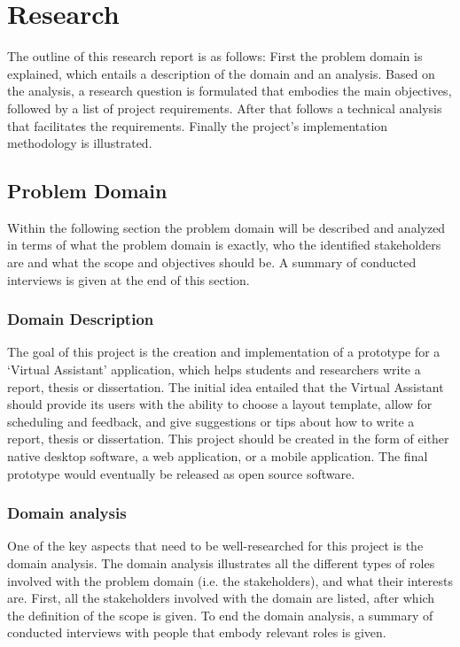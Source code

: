 \chapter{Research}

The outline of this research report is as follows: First the problem domain is explained, which entails a description of the domain and an analysis. Based on the analysis, a research question is formulated that embodies the main objectives, followed by a list of project requirements. After that follows a technical analysis that facilitates the requirements. Finally the project's implementation methodology is illustrated.

\section{Problem Domain} %
\label{sec:problem_domain}


Within the following section the problem domain will be described and analyzed in terms of what the problem domain is exactly, who the identified stakeholders are and what the scope and objectives should be. A summary of conducted interviews is given at the end of this section.

\subsection{Domain Description} %
\label{sub:problem_description}

The goal of this project is the creation and implementation of a prototype for a `Virtual Assistant' application, which helps students and researchers write a report, thesis or dissertation. The initial idea entailed that the Virtual Assistant should provide its users with the ability to choose a layout template, allow for scheduling and feedback, and give suggestions or tips about how to write a report, thesis or dissertation. This project should be created in the form of either native desktop software, a web application, or a mobile application. The final prototype would eventually be released as open source software.

\subsection{Domain analysis} %

One of the key aspects that need to be well-researched for this project is the domain analysis. The domain analysis illustrates all the different types of roles involved with the problem domain (i.e. the stakeholders), and what their interests are. First, all the stakeholders involved with the domain are listed, after which the definition of the scope is given. To end the domain analysis, a summary of conducted interviews with people that embody relevant roles is given.

